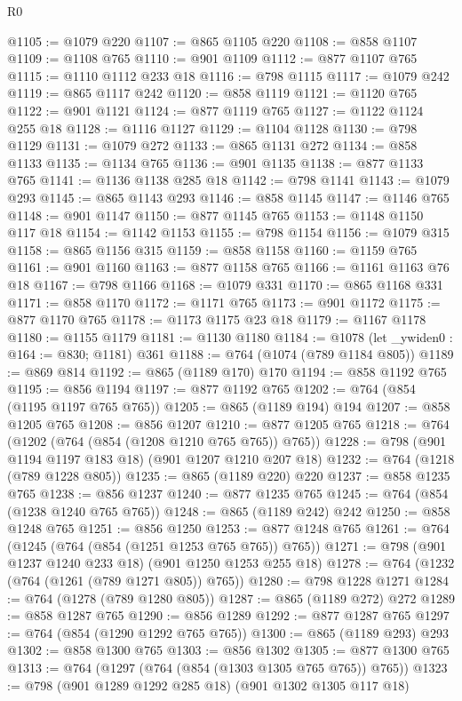 \begin{lexlean}{R0}
\begin{coremodule}
@1105 := @1079 @220
@1107 := @865 @1105 @220
@1108 := @858 @1107
@1109 := @1108 @765
@1110 := @901 @1109
@1112 := @877 @1107 @765
@1115 := @1110 @1112 @233 @18
@1116 := @798 @1115
@1117 := @1079 @242
@1119 := @865 @1117 @242
@1120 := @858 @1119
@1121 := @1120 @765
@1122 := @901 @1121
@1124 := @877 @1119 @765
@1127 := @1122 @1124 @255 @18
@1128 := @1116 @1127
@1129 := @1104 @1128
@1130 := @798 @1129
@1131 := @1079 @272
@1133 := @865 @1131 @272
@1134 := @858 @1133
@1135 := @1134 @765
@1136 := @901 @1135
@1138 := @877 @1133 @765
@1141 := @1136 @1138 @285 @18
@1142 := @798 @1141
@1143 := @1079 @293
@1145 := @865 @1143 @293
@1146 := @858 @1145
@1147 := @1146 @765
@1148 := @901 @1147
@1150 := @877 @1145 @765
@1153 := @1148 @1150 @117 @18
@1154 := @1142 @1153
@1155 := @798 @1154
@1156 := @1079 @315
@1158 := @865 @1156 @315
@1159 := @858 @1158
@1160 := @1159 @765
@1161 := @901 @1160
@1163 := @877 @1158 @765
@1166 := @1161 @1163 @76 @18
@1167 := @798 @1166
@1168 := @1079 @331
@1170 := @865 @1168 @331
@1171 := @858 @1170
@1172 := @1171 @765
@1173 := @901 @1172
@1175 := @877 @1170 @765
@1178 := @1173 @1175 @23 @18
@1179 := @1167 @1178
@1180 := @1155 @1179
@1181 := @1130 @1180
@1184 := @1078 (let _ywiden0 : @164 := @830; @1181) @361
@1188 := @764 (@1074 (@789 @1184 @805))
@1189 := @869 @814
@1192 := @865 (@1189 @170) @170
@1194 := @858 @1192 @765
@1195 := @856 @1194
@1197 := @877 @1192 @765
@1202 := @764 (@854 (@1195 @1197 @765 @765))
@1205 := @865 (@1189 @194) @194
@1207 := @858 @1205 @765
@1208 := @856 @1207
@1210 := @877 @1205 @765
@1218 := @764 (@1202 (@764 (@854 (@1208 @1210 @765 @765)) @765))
@1228 := @798 (@901 @1194 @1197 @183 @18) (@901 @1207 @1210 @207 @18)
@1232 := @764 (@1218 (@789 @1228 @805))
@1235 := @865 (@1189 @220) @220
@1237 := @858 @1235 @765
@1238 := @856 @1237
@1240 := @877 @1235 @765
@1245 := @764 (@854 (@1238 @1240 @765 @765))
@1248 := @865 (@1189 @242) @242
@1250 := @858 @1248 @765
@1251 := @856 @1250
@1253 := @877 @1248 @765
@1261 := @764 (@1245 (@764 (@854 (@1251 @1253 @765 @765)) @765))
@1271 := @798 (@901 @1237 @1240 @233 @18) (@901 @1250 @1253 @255 @18)
@1278 := @764 (@1232 (@764 (@1261 (@789 @1271 @805)) @765))
@1280 := @798 @1228 @1271
@1284 := @764 (@1278 (@789 @1280 @805))
@1287 := @865 (@1189 @272) @272
@1289 := @858 @1287 @765
@1290 := @856 @1289
@1292 := @877 @1287 @765
@1297 := @764 (@854 (@1290 @1292 @765 @765))
@1300 := @865 (@1189 @293) @293
@1302 := @858 @1300 @765
@1303 := @856 @1302
@1305 := @877 @1300 @765
@1313 := @764 (@1297 (@764 (@854 (@1303 @1305 @765 @765)) @765))
@1323 := @798 (@901 @1289 @1292 @285 @18) (@901 @1302 @1305 @117 @18)

\end{coremodule}
\end{lexlean}

